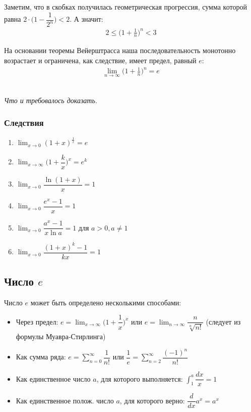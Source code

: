 \documentclass[a4paper,12pt,oneside]{extbook}
\newcommand{\newpar}{$ $\par\nobreak\ignorespaces}
\theoremstyle{numbered}
\theoremstyle{unnumbered}
\theoremstyle{named}
\theoremstyle{unnumbered}
\theoremstyle{named}
\theoremstyle{named}
\theoremstyle{named}
\renewenvironment{proof}[1][]{\breakenv[Доказательство]{\if\relax\detokenize{#1}\relax\else\;\fi}{\textbf{#1}}}{\smallskip\newpar \hfill\textit{Что и требовалось доказать.}}
\begin{document}
\begin{proof}
    Заметим, что в скобках получилась геометрическая прогрессия, сумма которой равна \(2 \cdot \Big(1 - \dfrac{1}{2^n}\Big) < 2\). А значит:
    \begin{gather*}
        2 \leq \Big(1 + \frac{1}{n}\Big)^n < 3
    \end{gather*}

    На основании теоремы Вейерштрасса наша последовательность монотонно возрастает и ограничена, как следствие, имеет предел, равный \(e\):
    \begin{gather*}
        \lim_{n \to \infty}{\Big(1 + \frac{1}{n}\Big)^n} = e
    \end{gather*}
\end{proof}

\subsubsection{Следствия}
\begin{enumerate}
    \item {\(\displaystyle{\lim_{x \to 0}{(1 + x)^{\frac{1}{x}}} = e}\)}
    \item {\(\displaystyle{\lim_{x \to \infty}{\Big(1 + \dfrac{k}{x}\Big)^x} = e^k}\)}
    \item {\(\displaystyle{\lim_{x \to 0}{\dfrac{\ln{(1 + x)}}{x}} = 1}\)}
    \item {\(\displaystyle{\lim_{x \to 0}{\dfrac{e^x - 1}{x}} = 1}\)}
    \item {\(\displaystyle{\lim_{x \to 0}{\dfrac{a^x - 1}{x\ln{a}} = 1}}\) для \(a > 0, a \neq 1\)}
    \item {\(\displaystyle{\lim_{x \to 0}{\dfrac{(1 + x)^k - 1}{kx}} = 1}\)}
\end{enumerate}

\subsection{Число \(e\)}
Число \(e\) может быть определено несколькими способами:
\begin{itemize}
    \item {Через предел: \(e = \lim_{x \to \infty}{\Big(1 + \dfrac{1}{x}\Big)^x}\) или \(e = \lim_{n \to \infty}{\dfrac{n}{\sqrt[n]{n!}}}\) (следует из формулы Муавра-Стирлинга)}

    \item {Как сумма ряда: \(e = \displaystyle{\sum_{n = 0}^{\infty}{\dfrac{1}{n!}}}\) или \(\dfrac{1}{e} = \displaystyle{\sum_{n = 2}^{\infty}{\dfrac{(-1)^n}{n!}}}\) }

    \item {Как единственное число \(a\), для которого выполняется: \(\displaystyle{\int_{1}^{a}{\dfrac{dx}{x}} = 1}\)}

    \item {Как единственное полож. число \(a\), для которого верно: \(\dfrac{d}{dx}a^x = a^x\)}
\end{itemize}
\end{document}
